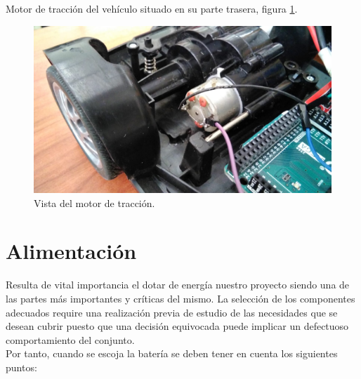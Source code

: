 Motor de tracción del vehículo situado en su parte trasera, figura \ref{img:motor_traccion}.

\begin{figure}[H]
  \begin{center}
    \includegraphics[scale=0.2]{imagenes/robot/motor-traccion.jpeg}
  \end{center}
  \caption{Vista del motor de tracción.}
  \label{img:motor_traccion}
\end{figure}


\section{Alimentación}
\label{sub:alimentación}

Resulta de vital importancia el dotar de energía nuestro proyecto siendo una de las partes más importantes y críticas del mismo. La selección de los componentes adecuados
require una realización previa de estudio de las necesidades que se desean cubrir puesto que una decisión equivocada puede implicar un defectuoso
comportamiento del conjunto.\\

Por tanto, cuando se escoja la batería se deben tener en cuenta los siguientes puntos:\\

